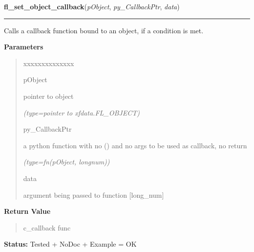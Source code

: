 \hspace{.8\funcindent}\begin{boxedminipage}{\funcwidth}

    \raggedright \textbf{fl\_set\_object\_callback}(\textit{pObject}, \textit{py\_CallbackPtr}, \textit{data})

    \vspace{-1.5ex}

    \rule{\textwidth}{0.5\fboxrule}
\setlength{\parskip}{2ex}
    Calls a callback function bound to an object, if a condition is met.

\setlength{\parskip}{1ex}
      \textbf{Parameters}
      \vspace{-1ex}

      \begin{quote}
        \begin{Ventry}{xxxxxxxxxxxxxx}

          \item[pObject]

          pointer to object

            {\it (type=pointer to xfdata.FL\_OBJECT)}

          \item[py\_CallbackPtr]

          a python function with no () and no args to be used as callback, 
          no return

            {\it (type=fn(pObject, longnum))}

          \item[data]

          argument being passed to function [long\_num]

        \end{Ventry}

      \end{quote}

      \textbf{Return Value}
    \vspace{-1ex}

      \begin{quote}
      c\_callback func

      \end{quote}

\textbf{Status:} Tested + NoDoc + Example = OK



    \end{boxedminipage}

    \label{xformslib:library:fl_set_object_callback}

